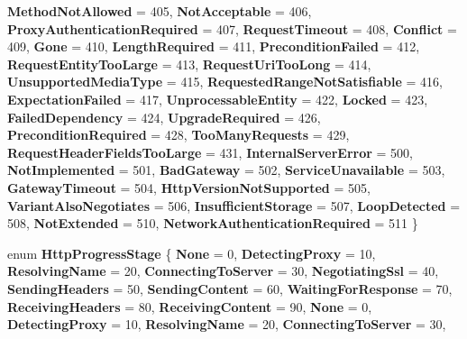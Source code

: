 \begin{DoxyCompactItemize}
{\bfseries Method\+Not\+Allowed} = 405, 
\newline
{\bfseries Not\+Acceptable} = 406, 
{\bfseries Proxy\+Authentication\+Required} = 407, 
{\bfseries Request\+Timeout} = 408, 
{\bfseries Conflict} = 409, 
\newline
{\bfseries Gone} = 410, 
{\bfseries Length\+Required} = 411, 
{\bfseries Precondition\+Failed} = 412, 
{\bfseries Request\+Entity\+Too\+Large} = 413, 
\newline
{\bfseries Request\+Uri\+Too\+Long} = 414, 
{\bfseries Unsupported\+Media\+Type} = 415, 
{\bfseries Requested\+Range\+Not\+Satisfiable} = 416, 
{\bfseries Expectation\+Failed} = 417, 
\newline
{\bfseries Unprocessable\+Entity} = 422, 
{\bfseries Locked} = 423, 
{\bfseries Failed\+Dependency} = 424, 
{\bfseries Upgrade\+Required} = 426, 
\newline
{\bfseries Precondition\+Required} = 428, 
{\bfseries Too\+Many\+Requests} = 429, 
{\bfseries Request\+Header\+Fields\+Too\+Large} = 431, 
{\bfseries Internal\+Server\+Error} = 500, 
\newline
{\bfseries Not\+Implemented} = 501, 
{\bfseries Bad\+Gateway} = 502, 
{\bfseries Service\+Unavailable} = 503, 
{\bfseries Gateway\+Timeout} = 504, 
\newline
{\bfseries Http\+Version\+Not\+Supported} = 505, 
{\bfseries Variant\+Also\+Negotiates} = 506, 
{\bfseries Insufficient\+Storage} = 507, 
{\bfseries Loop\+Detected} = 508, 
\newline
{\bfseries Not\+Extended} = 510, 
{\bfseries Network\+Authentication\+Required} = 511
 \}
\item 
\mbox{\label{namespace_windows_1_1_web_1_1_http_aa0f55350f3367ec69564a41407e44b3b}} 
enum {\bfseries Http\+Progress\+Stage} \{ \newline
{\bfseries None} = 0, 
{\bfseries Detecting\+Proxy} = 10, 
{\bfseries Resolving\+Name} = 20, 
{\bfseries Connecting\+To\+Server} = 30, 
\newline
{\bfseries Negotiating\+Ssl} = 40, 
{\bfseries Sending\+Headers} = 50, 
{\bfseries Sending\+Content} = 60, 
{\bfseries Waiting\+For\+Response} = 70, 
\newline
{\bfseries Receiving\+Headers} = 80, 
{\bfseries Receiving\+Content} = 90, 
{\bfseries None} = 0, 
{\bfseries Detecting\+Proxy} = 10, 
\newline
{\bfseries Resolving\+Name} = 20, 
{\bfseries Connecting\+To\+Server} = 30, 

\end{DoxyCompactItemize}

